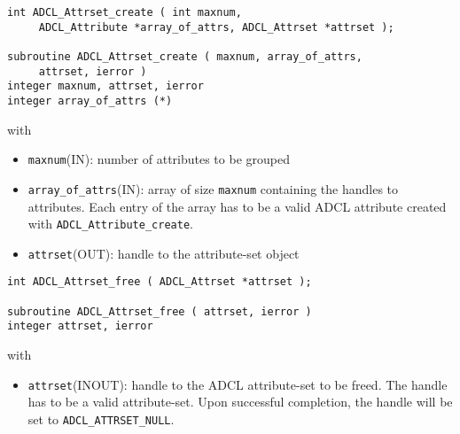 \hspace{1cm}
\begin{verbatim}
int ADCL_Attrset_create ( int maxnum, 
     ADCL_Attribute *array_of_attrs, ADCL_Attrset *attrset );

subroutine ADCL_Attrset_create ( maxnum, array_of_attrs, 
     attrset, ierror )
integer maxnum, attrset, ierror
integer array_of_attrs (*)
\end{verbatim}
with
\begin{itemize}
\item {\tt maxnum}(IN): number of attributes to be grouped
\item {\tt array\_of\_attrs}(IN): array of size {\tt maxnum} containing the handles to attributes. Each entry of the array has to be a valid ADCL attribute created with {\tt ADCL\_Attribute\_create}.
\item {\tt attrset}(OUT): handle to the attribute-set object
\end{itemize}
\hspace{1cm}
\begin{verbatim}
int ADCL_Attrset_free ( ADCL_Attrset *attrset );

subroutine ADCL_Attrset_free ( attrset, ierror )
integer attrset, ierror
\end{verbatim}
with
\begin{itemize}
\item {\tt attrset}(INOUT): handle to the ADCL attribute-set to be freed. The handle has to be a valid attribute-set.
    	Upon successful completion, the handle will be set to {\tt ADCL\_ATTRSET\_NULL}.
\end{itemize}